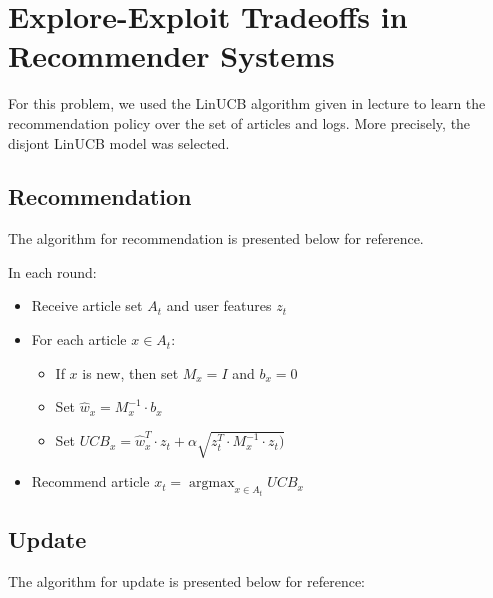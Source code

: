\documentclass[a4paper, 11pt]{article}
\begin{document}
\newpage

\section{Explore-Exploit Tradeoffs in Recommender Systems}
For this problem, we used the LinUCB algorithm given in lecture to learn the recommendation policy over the set of articles and logs. More precisely, the disjont LinUCB model was selected.

\subsection{Recommendation}

The algorithm for recommendation is presented below for reference.
\newline

In each round:
\begin{itemize}

\item Receive article set $A_t$ and user features $z_t$
\item For each article $x \in A_t$:

\begin{itemize}

    \item If $x$ is new, then set $M_x = I$ and $b_x = 0$
    \item Set $\hat{w}_x = M_x^{-1} \cdot b_x$
    \item Set $UCB_x = \hat{w}_x^T \cdot z_t + \alpha \sqrt{z_t^T \cdot M_x^{-1} \cdot z_t)}$

\end{itemize}
        
\item Recommend article $x_t = 
    \operatorname{argmax}_{x \in A_t} UCB_x$
        
\end {itemize}


\subsection{Update}

The algorithm for update is presented below for reference:
\newline
\end{document}
